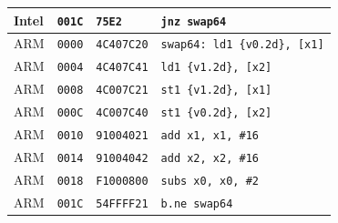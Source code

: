 \begin{table}[htbp]
\begin{tabular}{@{}l|l|l|p{7.2cm}@{}}
Intel & \texttt{001C} & \texttt{75E2} & \texttt{jnz swap64} \\
\midrule
ARM & \texttt{0000} & \texttt{4C407C20} & \texttt{swap64: ld1 \{v0.2d\}, [x1]} \\
ARM & \texttt{0004} & \texttt{4C407C41} & \texttt{ld1 \{v1.2d\}, [x2]} \\
ARM & \texttt{0008} & \texttt{4C007C21} & \texttt{st1 \{v1.2d\}, [x1]} \\
ARM & \texttt{000C} & \texttt{4C007C40} & \texttt{st1 \{v0.2d\}, [x2]} \\
ARM & \texttt{0010} & \texttt{91004021} & \texttt{add x1, x1, \#16} \\
ARM & \texttt{0014} & \texttt{91004042} & \texttt{add x2, x2, \#16} \\
ARM & \texttt{0018} & \texttt{F1000800} & \texttt{subs x0, x0, \#2} \\
ARM & \texttt{001C} & \texttt{54FFFF21} & \texttt{b.ne swap64} \\
\bottomrule
\end{tabular}
\endgroup
\end{table}
\noindent{}\par

